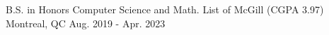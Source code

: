 

\begin{cventries}

  \cventry
  {B.S. in Honors Computer Science and Math. List of } %
  {McGill (CGPA 3.97)} %
    {Montreal, QC} %
    {Aug. 2019 - Apr. 2023} %
    {
    }

\end{cventries}

